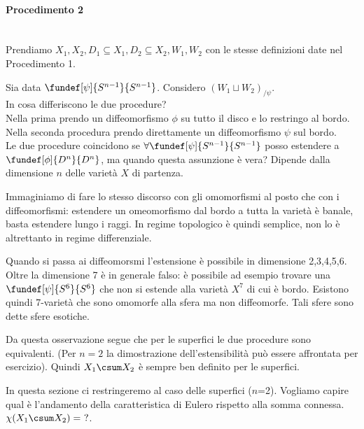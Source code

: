 \paragraph{Procedimento 2}~\\
Prendiamo $X_1, X_2, D_1 \subseteq X_1, D_2 \subseteq X_2, W_1, W_2$ con le stesse definizioni date nel Procedimento 1.

Sia data $\fundef[\psi]{S^{n-1}}{S^{n-1}}$. Considero $(W_1 \sqcup W_2)_{/\psi}$.
\\

In cosa differiscono le due procedure?\\
Nella prima prendo un diffeomorfismo $\phi$ su tutto il disco e lo restringo al bordo. Nella seconda procedura prendo direttamente un diffeomorfismo $\psi$ sul bordo.\\
Le due procedure coincidono se $\forall \fundef[\psi]{S^{n-1}}{S^{n-1}}$ posso estendere a $\fundef[\phi ]{D^n}{D^n}$, ma quando questa assunzione è vera? Dipende dalla dimensione $n$ delle varietà $X$ di partenza.

\begin{oss}
Immaginiamo di fare lo stesso discorso con gli omomorfismi al posto che con i diffeomorfismi: estendere un omeomorfismo dal bordo a tutta la varietà è banale, basta estendere lungo i raggi.
In regime topologico è quindi semplice, non lo è altrettanto in regime differenziale.

Quando si passa ai diffeomorsmi l'estensione è possibile in dimensione 2,3,4,5,6. Oltre la dimensione 7 è in generale falso: è possibile ad esempio trovare una $\fundef[\psi]{S^6}{S^6}$ che non si estende alla varietà $X^7$ di cui è bordo. Esistono quindi 7-varietà che sono omomorfe alla sfera ma non diffeomorfe. Tali sfere sono dette sfere esotiche.
\end{oss}

Da questa osservazione segue che per le superfici le due procedure sono equivalenti. (Per $n=2$ la dimostrazione dell'estensibilità può essere affrontata per esercizio). Quindi $X_1 \csum X_2$ è sempre ben definito per le superfici.

\begin{epigraphs}	
\end{epigraphs}


In questa sezione ci restringeremo al caso delle superfici ($n$=2). Vogliamo capire qual è l'andamento della caratteristica di Eulero rispetto alla somma connessa. $\chi(X_1 \csum X_2) =~?$.

